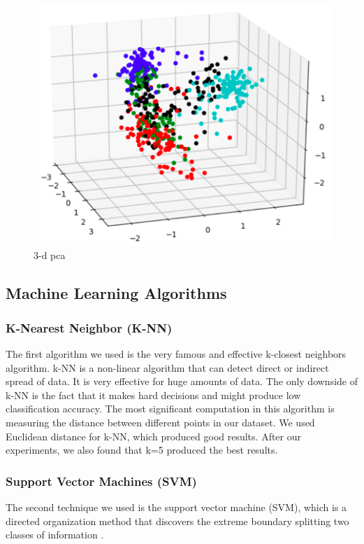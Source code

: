 \begin{figure}
\begin{center}
\includegraphics[scale=0.3]{./figures/3_d_plot.png}
\end{center}
\caption
{
3-d pca
}
\label{fig:big_picture5}
\end{figure}

\subsection{Machine Learning Algorithms}
\subsubsection{\textbf{K-Nearest Neighbor (K-NN)}}
The first algorithm we used is the very famous and effective k-closest neighbors algorithm. k-NN is a non-linear algorithm that can detect direct or indirect spread of data. It is very effective for huge amounts of data. The only downside of k-NN is the fact that it makes hard decisions and might produce low classification accuracy. The most significant computation in this algorithm is measuring the distance between different points in our dataset. We used Euclidean distance for k-NN, which produced good results. After our experiments, we also found that k=5 produced the best results. 

\subsubsection{\textbf{Support Vector Machines (SVM)}}
The second technique we used is the support vector machine (SVM), which is a directed organization method that discovers the extreme boundary splitting two classes of information \cite{SVM:2006}. 

